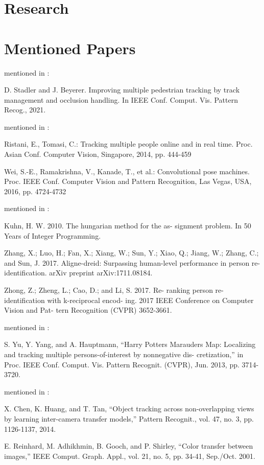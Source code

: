 \section{Research}

\section{Mentioned Papers}

mentioned in \cite{Specker21}:

D. Stadler and J. Beyerer. Improving multiple pedestrian tracking by track management and occlusion handling. In IEEE Conf. Comput. Vis. Pattern Recog., 2021.

mentioned in \cite{Yoon18}:

Ristani, E., Tomasi, C.: Tracking multiple people online and in real time. Proc. Asian Conf. Computer Vision, Singapore, 2014, pp. 444-459

Wei, S.-E., Ramakrishna, V., Kanade, T., et al.: Convolutional pose machines. Proc. IEEE Conf. Computer Vision and Pattern Recognition, Las Vegas, USA, 2016, pp. 4724-4732

mentioned in \cite{Zhang17}:

Kuhn, H. W. 2010. The hungarian method for the as- signment problem. In 50 Years of Integer Programming.

Zhang, X.; Luo, H.; Fan, X.; Xiang, W.; Sun, Y.; Xiao, Q.; Jiang, W.; Zhang, C.; and Sun, J. 2017. Aligne-dreid: Surpassing human-level performance in person re- identification. arXiv preprint arXiv:1711.08184.

Zhong, Z.; Zheng, L.; Cao, D.; and Li, S. 2017. Re- ranking person re-identification with k-reciprocal encod- ing. 2017 IEEE Conference on Computer Vision and Pat- tern Recognition (CVPR) 3652-3661.

mentioned in \cite{Chen17a}:

S. Yu, Y. Yang, and A. Hauptmann, “Harry Potters Marauders Map: Localizing and tracking multiple persons-of-interest by nonnegative dis- cretization,” in Proc. IEEE Conf. Comput. Vis. Pattern Recognit. (CVPR), Jun. 2013, pp. 3714-3720.

mentioned in \cite{Chen17b}:

X. Chen, K. Huang, and T. Tan, “Object tracking across non-overlapping views by learning inter-camera transfer models,” Pattern Recognit., vol. 47, no. 3, pp. 1126-1137, 2014.

E. Reinhard, M. Adhikhmin, B. Gooch, and P. Shirley, “Color transfer between images,” IEEE Comput. Graph. Appl., vol. 21, no. 5, pp. 34-41, Sep./Oct. 2001.

